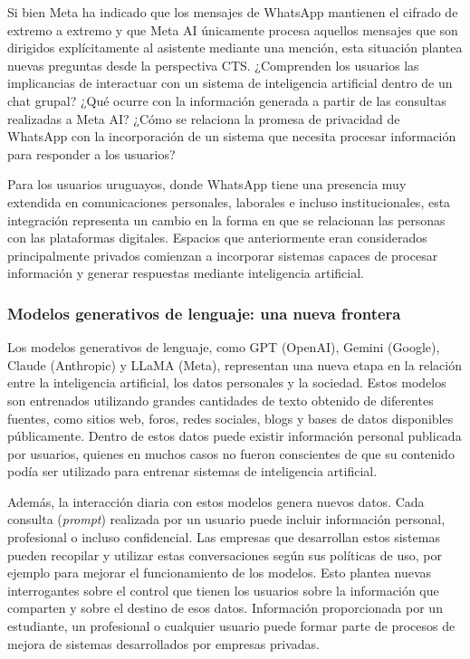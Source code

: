 \documentclass[11pt,a4paper]{article}
\begin{document}
Si bien Meta ha indicado que los mensajes de WhatsApp mantienen el cifrado de extremo a extremo y que Meta AI únicamente procesa aquellos mensajes que son dirigidos explícitamente al asistente mediante una mención, esta situación plantea nuevas preguntas desde la perspectiva CTS. ¿Comprenden los usuarios las implicancias de interactuar con un sistema de inteligencia artificial dentro de un chat grupal? ¿Qué ocurre con la información generada a partir de las consultas realizadas a Meta AI? ¿Cómo se relaciona la promesa de privacidad de WhatsApp con la incorporación de un sistema que necesita procesar información para responder a los usuarios?

Para los usuarios uruguayos, donde WhatsApp tiene una presencia muy extendida en comunicaciones personales, laborales e incluso institucionales, esta integración representa un cambio en la forma en que se relacionan las personas con las plataformas digitales. Espacios que anteriormente eran considerados principalmente privados comienzan a incorporar sistemas capaces de procesar información y generar respuestas mediante inteligencia artificial.

\subsubsection{Modelos generativos de lenguaje: una nueva frontera}

Los modelos generativos de lenguaje, como GPT (OpenAI), Gemini (Google), Claude (Anthropic) y LLaMA (Meta), representan una nueva etapa en la relación entre la inteligencia artificial, los datos personales y la sociedad. Estos modelos son entrenados utilizando grandes cantidades de texto obtenido de diferentes fuentes, como sitios web, foros, redes sociales, blogs y bases de datos disponibles públicamente. Dentro de estos datos puede existir información personal publicada por usuarios, quienes en muchos casos no fueron conscientes de que su contenido podía ser utilizado para entrenar sistemas de inteligencia artificial.

Además, la interacción diaria con estos modelos genera nuevos datos. Cada consulta (\textit{prompt}) realizada por un usuario puede incluir información personal, profesional o incluso confidencial. Las empresas que desarrollan estos sistemas pueden recopilar y utilizar estas conversaciones según sus políticas de uso, por ejemplo para mejorar el funcionamiento de los modelos. Esto plantea nuevas interrogantes sobre el control que tienen los usuarios sobre la información que comparten y sobre el destino de esos datos. Información proporcionada por un estudiante, un profesional o cualquier usuario puede formar parte de procesos de mejora de sistemas desarrollados por empresas privadas.
\end{document}
